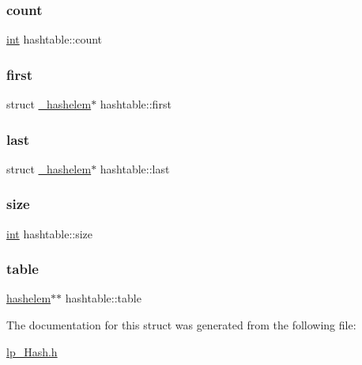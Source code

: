 \mbox{\label{structhashtable_a849d7b9cab945feabe177cd5e61f46a7}} 
\subsubsection{\texorpdfstring{count}{count}}
{\footnotesize\ttfamily \hyperlink{lp__lib_8h_adeb9ec6400320e4923ac9d836d509ddb}{int} hashtable\+::count}

\mbox{\label{structhashtable_a7469fff709a4b9b9ee801a656c79d9b4}} 
\subsubsection{\texorpdfstring{first}{first}}
{\footnotesize\ttfamily struct \hyperlink{struct__hashelem}{\+\_\+hashelem}$\ast$ hashtable\+::first}

\mbox{\label{structhashtable_a769438ba5b3d875ce6e3322afe843179}} 
\subsubsection{\texorpdfstring{last}{last}}
{\footnotesize\ttfamily struct \hyperlink{struct__hashelem}{\+\_\+hashelem}$\ast$ hashtable\+::last}

\mbox{\label{structhashtable_ab62bd10297b090cfce7d728fd650e51d}} 
\subsubsection{\texorpdfstring{size}{size}}
{\footnotesize\ttfamily \hyperlink{lp__lib_8h_adeb9ec6400320e4923ac9d836d509ddb}{int} hashtable\+::size}

\mbox{\label{structhashtable_a097815b109b5896f483851b347f7a165}} 
\subsubsection{\texorpdfstring{table}{table}}
{\footnotesize\ttfamily \hyperlink{lp___hash_8h_a27375934623e0b5c611bb7ba867cc99f}{hashelem}$\ast$$\ast$ hashtable\+::table}



The documentation for this struct was generated from the following file\+:\begin{DoxyCompactItemize}
\item 
\hyperlink{lp___hash_8h}{lp\+\_\+\+Hash.\+h}\end{DoxyCompactItemize}
